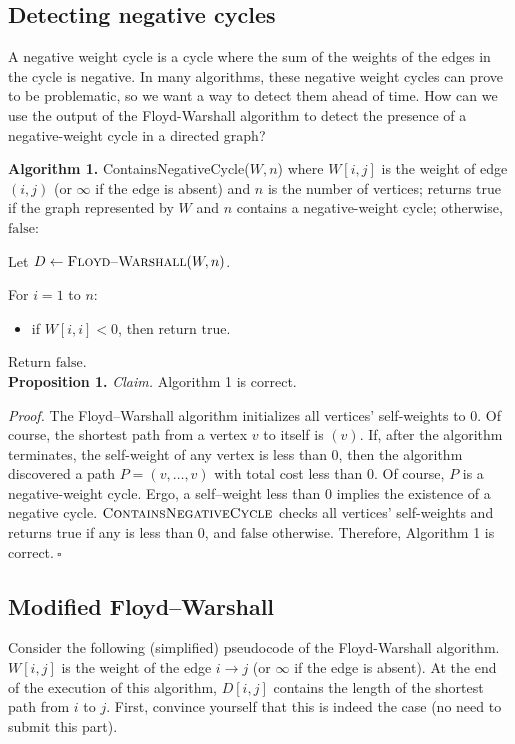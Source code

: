 \subsection{Detecting negative cycles}
A negative weight cycle is a cycle where the sum of the weights of the edges in the cycle is negative. In many algorithms, these negative weight cycles can prove to be problematic, so we want a way to detect them ahead of time. How can we use the output of the Floyd-Warshall algorithm to detect the presence
of a negative-weight cycle in a directed graph?
\begin{solution}

\textbf{Algorithm 1. }{\sc ContainsNegativeCycle}($W,n$) where $W[i,j]$ is the weight of edge $(i,j)$ (or $\infty$ if the edge is absent) and $n$ is the number of vertices; returns $\mathrm{true}$ if the graph represented by $W$ and $n$ contains a negative-weight cycle; otherwise, $\mathrm{false}$:

Let $D\leftarrow\textsc{Floyd--Warshall}(W,n)$.

For $i=1$ to $n$:
\begin{itemize}
    \item if $W[i,i]<0$, then return $\mathrm{true}$.
\end{itemize}

Return $\mathrm{false}$.\\

\textbf{Proposition 1. }\textit{Claim. }Algorithm 1 is correct.

\textit{Proof. }The {\sc Floyd--Warshall} algorithm initializes all vertices' self-weights to $0$. Of course, the shortest path from a vertex $v$ to itself is $(v)$. If, after the algorithm terminates, the self-weight of any vertex is less than $0$, then the algorithm discovered a path $P=(v,\dots,v)$ with total cost less than $0$. Of course, $P$ is a negative-weight cycle. Ergo, a self--weight less than $0$ implies the existence of a negative cycle. $\textsc{ContainsNegativeCycle}$ checks all vertices' self-weights and returns $\mathrm{true}$ if any is less than $0$, and $\mathrm{false}$ otherwise. Therefore, Algorithm 1 is correct.$~\square$
\end{solution}
\subsection{Modified Floyd--Warshall}
Consider the following (simplified) pseudocode of the Floyd-Warshall algorithm. $W[i,j]$ is the weight of the edge $i\rightarrow j$ (or $\infty$ if the edge is absent). At the end of the execution of this algorithm, $D[i,j]$ contains the length of the shortest path from $i$ to $j$. First, convince yourself that this is indeed the case (no need to submit this part).

